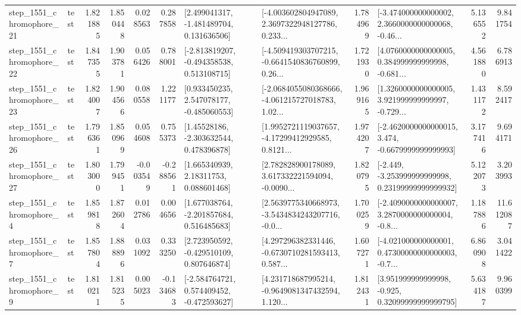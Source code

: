 \begin{tabular}{llrrrrllrlrr}
 step\_1551\_chromophore\_21 &      test &      1.821885 &    1.850448 &      0.028563 &  0.287858 &    [2.499041317, -1.481489704, 0.131636506] &  [-4.003602804947089, 2.3697322948127786, 0.233... &       1.784969 &  [-3.474000000000002, 2.3660000000000068, -0.46... &            5.136552 &          9.841754 \\
 step\_1551\_chromophore\_22 &      test &      1.847355 &    1.903781 &      0.056426 &  0.788001 &   [-2.813819207, -0.494358538, 0.513108715] &  [-4.509419303707215, -0.6641540836760899, 0.26... &       1.721930 &  [4.0760000000000005, 0.384999999999998, -0.681... &            4.561880 &          6.786913 \\
 step\_1551\_chromophore\_23 &      test &      1.824007 &    1.904566 &      0.080558 &  1.221177 &    [0.933450235, 2.547078177, -0.485060553] &  [-2.0684055080368666, -4.061215727018783, 1.02... &       1.969165 &  [1.3260000000000005, 3.921999999999997, -0.729... &            1.431172 &          8.592417 \\
 step\_1551\_chromophore\_26 &      test &      1.796361 &    1.850969 &      0.054608 &  0.755373 &     [1.45528186, -2.303632544, 0.478396878] &  [1.9952721119037657, -4.17299412929585, 0.8121... &       1.974207 &  [-2.4620000000000015, 3.474, -0.6679999999999993] &            3.177416 &          9.694171 \\
 step\_1551\_chromophore\_27 &      test &      1.803000 &    1.799451 &     -0.003549 & -0.288561 &      [1.665340939, 2.18311753, 0.088601468] &  [2.782828900178089, 3.617332221594094, -0.0090... &       1.820795 &  [-2.449, -3.253999999999998, 0.23199999999999932] &            5.122073 &          3.203993 \\
  step\_1551\_chromophore\_4 &      test &      1.859818 &    1.872604 &      0.012786 &  0.004656 &    [1.677038764, -2.201857684, 0.516485683] &  [2.5639775340668973, -3.5434834243207716, -0.0... &       1.700259 &  [-2.4090000000000007, 3.2870000000000004, -0.8... &            1.187886 &         11.612087 \\
  step\_1551\_chromophore\_7 &      test &      1.857804 &    1.888896 &      0.031092 &  0.333250 &    [2.723950592, -0.429510109, 0.807646874] &  [4.297296382331446, -0.6730710281593413, 0.587... &       1.607271 &  [-4.021000000000001, 0.47300000000000003, -0.7... &            6.860908 &          3.041422 \\
  step\_1551\_chromophore\_9 &      test &      1.810211 &    1.815235 &      0.005023 & -0.134683 &   [-2.584764721, 0.574409452, -0.472593627] &  [4.231718687995214, -0.9649081347432594, 1.120... &       1.812431 &   [3.951999999999998, -0.925, 0.32099999999999795] &            5.634187 &          9.960399 \\

\end{tabular}
